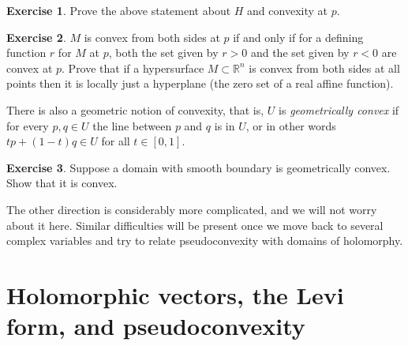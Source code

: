 \documentclass[12pt,openany]{book}
\newcommand{\R}{{\mathbb{R}}}
\newcommand{\myindex}[1]{#1\index{#1}}
\theoremstyle{plain}
\theoremstyle{remark}
\theoremstyle{definition}
\newenvironment{exbox}{%
    \def\FrameCommand{\vrule width 1pt \relax\hspace {10pt}}%
    \MakeFramed {\advance \hsize -\width \FrameRestore }%
}{%
    \endMakeFramed
}
\theoremstyle{exercise}
\newtheorem{exercise}{Exercise}[section]
\theoremstyle{example}
\begin{document}
\begin{exbox}
\begin{exercise}
Prove the above statement about $H$ and convexity at $p$.
\end{exercise}

\begin{exercise}
$M$ is convex from both sides at $p$ if and only if for a
defining function $r$ for $M$ at $p$, both the set given by
$r > 0$ and the set given by $r < 0$ are convex at $p$.
Prove that if a hypersurface $M \subset \R^n$ is convex from both sides at all
points then it is locally just a hyperplane (the zero set of a real affine
function).
\end{exercise}
\end{exbox}

There is also a geometric notion of convexity, that is, $U$ is
\emph{\myindex{geometrically convex}} if for every $p,q \in U$ the
line between $p$ and $q$ is in $U$, or in other words
$tp +(1-t)q \in U$ for all $t \in [0,1]$.

\begin{exbox}
\begin{exercise}
Suppose a domain with smooth
boundary is geometrically
convex.  Show that it is convex.
\end{exercise}
\end{exbox}

The other direction is considerably more complicated, and we will not worry
about it here.  Similar difficulties will be present once we move back to
several complex variables and try to relate pseudoconvexity with domains of
holomorphy.


\section{Holomorphic vectors, the Levi form, and pseudoconvexity}
\end{document}
